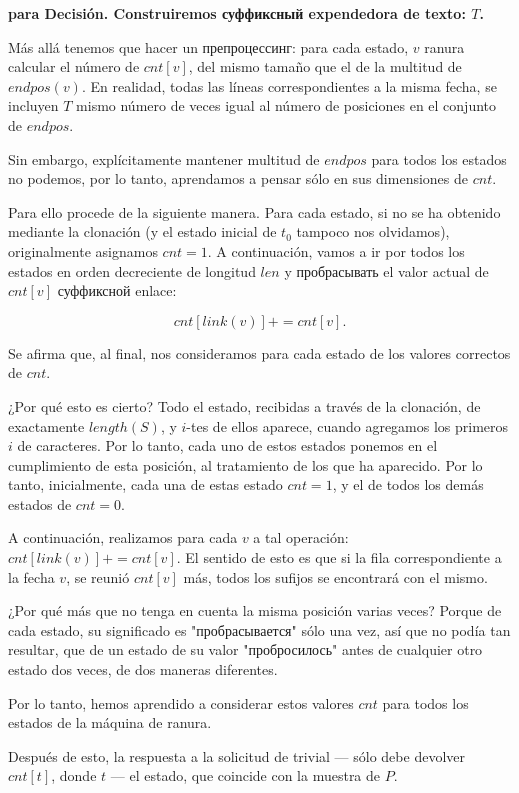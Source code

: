 \bf{para Decisión}. Construiremos суффиксный expendedora de texto: $T$. 

Más allá tenemos que hacer un препроцессинг: para cada estado, $v$ ranura calcular el número de $cnt[v]$, del mismo tamaño que el de la multitud de $endpos(v)$. En realidad, todas las líneas correspondientes a la misma fecha, se incluyen $T$ mismo número de veces igual al número de posiciones en el conjunto de $endpos$.

Sin embargo, explícitamente mantener multitud de $endpos$ para todos los estados no podemos, por lo tanto, aprendamos a pensar sólo en sus dimensiones de $cnt$.

Para ello procede de la siguiente manera. Para cada estado, si no se ha obtenido mediante la clonación (y el estado inicial de $t_0$ tampoco nos olvidamos), originalmente asignamos $cnt = 1$. A continuación, vamos a ir por todos los estados en orden decreciente de longitud $len$ y пробрасывать el valor actual de $cnt[v]$ суффиксной enlace:

$$ cnt[link(v)] += cnt[v]. $$

Se afirma que, al final, nos consideramos para cada estado de los valores correctos de $cnt$.

¿Por qué esto es cierto? Todo el estado, recibidas a través de la clonación, de exactamente $length(S)$, y $i$-tes de ellos aparece, cuando agregamos los primeros $i$ de caracteres. Por lo tanto, cada uno de estos estados ponemos en el cumplimiento de esta posición, al tratamiento de los que ha aparecido. Por lo tanto, inicialmente, cada una de estas estado $cnt = 1$, y el de todos los demás estados de $cnt = 0$.

A continuación, realizamos para cada $v$ a tal operación: $cnt[link(v)] += cnt[v]$. El sentido de esto es que si la fila correspondiente a la fecha $v$, se reunió $cnt[v]$ más, todos los sufijos se encontrará con el mismo.

¿Por qué más que no tenga en cuenta la misma posición varias veces? Porque de cada estado, su significado es "пробрасывается" sólo una vez, así que no podía tan resultar, que de un estado de su valor "пробросилось" antes de cualquier otro estado dos veces, de dos maneras diferentes.

Por lo tanto, hemos aprendido a considerar estos valores $cnt$ para todos los estados de la máquina de ranura.

Después de esto, la respuesta a la solicitud de trivial --- sólo debe devolver $cnt[t]$, donde $t$ --- el estado, que coincide con la muestra de $P$.


